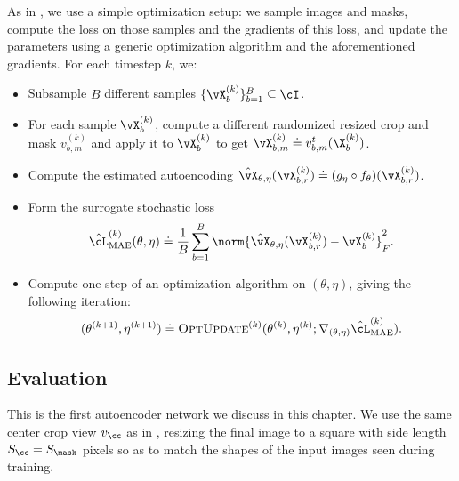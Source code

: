 \documentclass[../../book-main.tex]{subfiles}
\begin{document}
As in , we use a simple optimization setup: we sample images and masks, compute the loss on those samples and the gradients of this loss, and update the parameters using a generic optimization algorithm and the aforementioned gradients. For each timestep \(k\), we:
\begin{itemize}
    \item Subsample \(B\) different samples \(\{\vX_{b}^{(k)}\}_{b = 1}^{B} \subseteq \cI\).
    \item For each sample \(\vX_{b}^{(k)}\), compute a different randomized resized crop and mask \(v_{b, m}^{(k)}\) and apply it to \(\vX_{b}^{(k)}\) to get \(\vX_{b, m}^{(k)} \doteq v_{b, m}^{t}(\X_{b}^{(k)})\).
    \item Compute the estimated autoencoding \(\hat{\vX}_{\theta, \eta}(\vX_{b, r}^{(k)}) \doteq (g_{\eta} \circ f_{\theta})(\vX_{b, r}^{(k)})\).
    \item Form the surrogate stochastic loss 
    \begin{equation}
        \hat{\cL}_{\mathrm{MAE}}^{(k)}(\theta, \eta) \doteq \frac{1}{B}\sum_{b = 1}^{B}\norm{\hat{\vX}_{\theta, \eta}(\vX_{b, r}^{(k)}) - \vX_{b}^{(k)}}_{F}^{2}.
    \end{equation}
    \item Compute one step of an optimization algorithm on \((\theta, \eta)\), giving the following iteration:
    \begin{equation}
        (\theta^{(k + 1)}, \eta^{(k + 1)}) \doteq \textsc{OptUpdate}^{(k)}(\theta^{(k)}, \eta^{(k)}; \nabla_{(\theta, \eta)}\hat{\cL}_{\mathrm{MAE}}^{(k)}).
    \end{equation}
\end{itemize}

\subsection{Evaluation} \label{sub:image_completion_optimization_1}

This is the first autoencoder network we discuss in this chapter. We use the same center crop view \(v_{\cc}\) as in , resizing the final image to a square with side length \(S_{\cc} = S_{\mask}\) pixels so as to match the shapes of the input images seen during training. 
\end{document}
